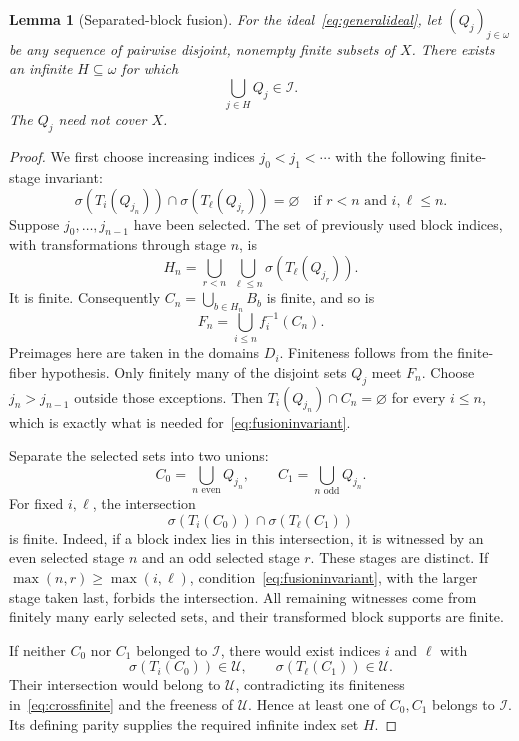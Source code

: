 \documentclass[11pt,a4paper]{article}
\newtheorem{lemma}[theorem]{Lemma}
\theoremstyle{definition}
\theoremstyle{remark}
\newcommand{\I}{\mathcal I}
\newcommand{\U}{\mathcal U}
\newcommand{\supp}{\sigma}
\begin{document}
\begin{lemma}[Separated-block fusion]
\label{lem:fusion}
For the ideal~\eqref{eq:generalideal}, let $(Q_j)_{j\in\omega}$ be any
sequence of pairwise disjoint, nonempty finite subsets of $X$. There
exists an infinite $H\subseteq\omega$ for which
\[
                        \bigcup_{j\in H} Q_j\in\I.
\]
The $Q_j$ need not cover $X$.
\end{lemma}
\begin{proof}
We first choose increasing indices $j_0<j_1<\cdots$ with the following
finite-stage invariant:
\begin{equation}
\label{eq:fusioninvariant}
 \supp(T_i(Q_{j_n}))\cap\supp(T_\ell(Q_{j_r}))=\varnothing
 \quad\text{if }r<n\text{ and }i,\ell\le n.
\end{equation}
Suppose $j_0,\ldots,j_{n-1}$ have been selected. The set of previously
used block indices, with transformations through stage $n$, is
\[
 H_n=\bigcup_{r<n}\ \bigcup_{\ell\le n}
                         \supp(T_\ell(Q_{j_r})).
\]
It is finite. Consequently $C_n=\bigcup_{b\in H_n}B_b$ is finite, and so
is
\[
                  F_n=\bigcup_{i\le n} f_i^{-1}(C_n).
\]
Preimages here are taken in the domains $D_i$. Finiteness follows from
the finite-fiber hypothesis. Only finitely many of the disjoint sets
$Q_j$ meet $F_n$. Choose $j_n>j_{n-1}$ outside those exceptions. Then
$T_i(Q_{j_n})\cap C_n=\varnothing$ for every $i\le n$, which is exactly
what is needed for~\eqref{eq:fusioninvariant}.

Separate the selected sets into two unions:
\[
 C_0=\bigcup_{n\text{ even}}Q_{j_n},
 \qquad
 C_1=\bigcup_{n\text{ odd}}Q_{j_n}.
\]
For fixed $i,\ell$, the intersection
\begin{equation}
\label{eq:crossfinite}
                  \supp(T_i(C_0))\cap\supp(T_\ell(C_1))
\end{equation}
is finite. Indeed, if a block index lies in this intersection, it is
witnessed by an even selected stage $n$ and an odd selected stage $r$.
These stages are distinct. If $\max(n,r)\ge\max(i,\ell)$,
condition~\eqref{eq:fusioninvariant}, with the larger stage taken last,
forbids the intersection. All remaining witnesses come from finitely
many early selected sets, and their transformed block supports are
finite.

If neither $C_0$ nor $C_1$ belonged to $\I$, there would exist indices
$i$ and $\ell$ with
\[
                 \supp(T_i(C_0))\in\U,
       \qquad    \supp(T_\ell(C_1))\in\U.
\]
Their intersection would belong to $\U$, contradicting its finiteness
in~\eqref{eq:crossfinite} and the freeness of $\U$. Hence at least one
of $C_0,C_1$ belongs to $\I$. Its defining parity supplies the required
infinite index set $H$.
\end{proof}
\end{document}
